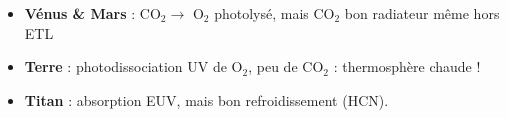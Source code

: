\begin{itemize}
\item {\bf Vénus \& Mars} : CO$_2 \rightarrow$ O$_2$ photolysé, mais CO$_2$
  bon radiateur même hors ETL 
\item {\bf Terre} : photodissociation UV de O$_2$, peu de CO$_2$ :
  thermosphère chaude !
\item {\bf Titan} : absorption EUV, mais bon refroidissement (HCN).
\end{itemize}
